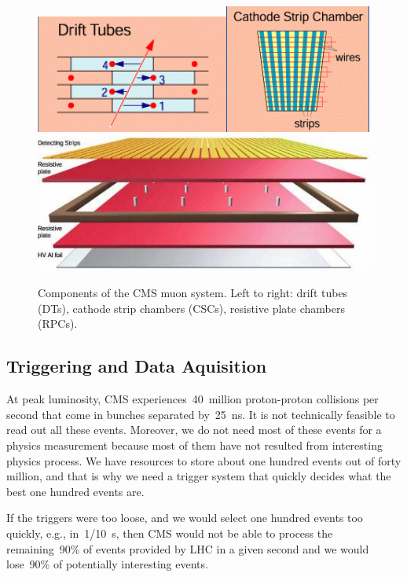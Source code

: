 \begin{figure}[htb]
  \begin{center}
    \includegraphics[height=2.5 cm]{../figs/Exp/muonSystem_driftTubes.png}\quad\includegraphics[height=2.5 cm]{../figs/Exp/muonSystem_CSC.png}\quad\includegraphics[height=2.5 cm]{../figs/Exp/muonSystem_RPC.png}
    \caption{Components of the CMS muon system. Left to right: drift tubes (DTs), cathode strip chambers (CSCs), resistive plate chambers (RPCs).}
    \label{fig:muonSystem}
  \end{center}
\end{figure}


\subsection{Triggering and Data Aquisition}

At peak luminosity, CMS experiences~40~million proton-proton collisions per second that come in bunches separated by~25~ns. It is not technically feasible to read out all these events. Moreover, we do not need most of these events for a physics measurement because most of them have not resulted from interesting physics process. We have resources to store about one hundred events out of forty million, and that is why we need a trigger system that quickly decides what the best one hundred events are.


If the triggers were too loose, and we would select one hundred events too quickly, e.g., in~1/10~s, then CMS would not be able to process the remaining~90\% of events provided by LHC in a given second and we would lose~90\% of potentially interesting events.

